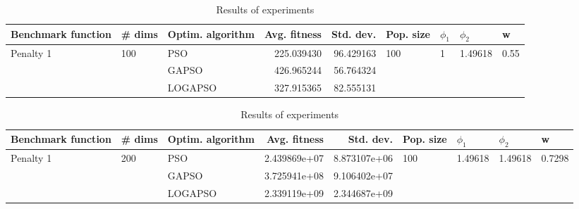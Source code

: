 \documentclass{article}
\begin{document}
\begin{table}
\centering
\caption{Results of experiments}
\begin{tabular}{lllrrllll}
\toprule
        Benchmark function &              \# dims & Optim. algorithm &  Avg. fitness &  Std. dev. &            Pop. size &         $\phi_{1}$ &               $\phi_{2}$ &                     w \\
\midrule
\multirow{3}{*}{Penalty 1} & \multirow{3}{*}{100} &              PSO &    225.039430 &  96.429163 & \multirow{3}{*}{100} & \multirow{3}{*}{1} & \multirow{3}{*}{1.49618} & \multirow{3}{*}{0.55} \\
                           &                      &            GAPSO &    426.965244 &  56.764324 &                      &                    &                          &                       \\
                           &                      &          LOGAPSO &    327.915365 &  82.555131 &                      &                    &                          &                       \\
\bottomrule
\end{tabular}
\end{table}
\begin{table}
\centering
\caption{Results of experiments}
\begin{tabular}{lllrrllll}
\toprule
        Benchmark function &              \# dims & Optim. algorithm &  Avg. fitness &    Std. dev. &            Pop. size &               $\phi_{1}$ &               $\phi_{2}$ &                       w \\
\midrule
\multirow{3}{*}{Penalty 1} & \multirow{3}{*}{200} &              PSO &  2.439869e+07 & 8.873107e+06 & \multirow{3}{*}{100} & \multirow{3}{*}{1.49618} & \multirow{3}{*}{1.49618} & \multirow{3}{*}{0.7298} \\
                           &                      &            GAPSO &  3.725941e+08 & 9.106402e+07 &                      &                          &                          &                         \\
                           &                      &          LOGAPSO &  2.339119e+09 & 2.344687e+09 &                      &                          &                          &                         \\
\bottomrule
\end{tabular}
\end{table}
\end{document}

